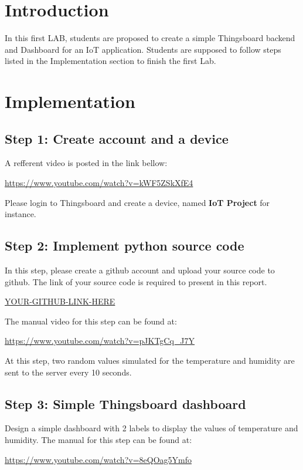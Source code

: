 \documentclass[a4paper,11pt]{article}
\theoremstyle{mytheor}
\begin{document}
\renewcommand{\contentsname}{Content}
\newpage
\vspace{1cm}
\tableofcontents
\newpage

\section{Introduction}
In this first LAB, students are proposed to create a simple Thingsboard backend and Dashboard for an IoT application. Students are supposed to follow steps listed in the Implementation section to finish the first Lab.

\section{Implementation}

\subsection{Step 1: Create account and a device}
A refferent video is posted in the link bellow:
\begin{center}
    \url{https://www.youtube.com/watch?v=kWF5ZSkXfE4}
\end{center}

Please login to Thingsboard and create a device, named \textbf{IoT Project} for instance. 


\subsection{Step 2: Implement python source code}
In this step, please create a github account and upload your source code to github. The link of your source code is required to present in this report.

\begin{center}
    \url{YOUR-GITHUB-LINK-HERE}
\end{center}

The manual video for this step can be found at:
\begin{center}
    \url{https://www.youtube.com/watch?v=pJKTgCq\_J7Y}
\end{center}

At this step, two random values simulated for the temperature and humidity are sent to the server every 10 seconds.

\subsection{Step 3: Simple Thingsboard dashboard}
Design a simple dashboard with 2 labels to display the values of temperature and humidity. The manual for this step can be found at:
\begin{center}
    \url{https://www.youtube.com/watch?v=8eQOag5Ymfo}
\end{center}
\end{document}
